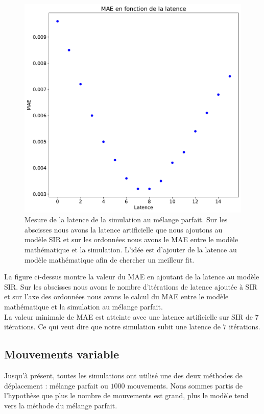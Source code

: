 \newpage

\begin{figure}[h]
	\centering
	\captionsetup{justification=centering}
	\includegraphics[width=.7\textwidth]{Images/SIR_latence_8_5.pdf}
	\caption[Mesures de latences SIR]{Mesure de la latence de la simulation au mélange parfait. Sur les abscisses nous avons la latence artificielle que nous ajoutons au modèle SIR et sur les ordonnées nous avons le MAE entre le modèle mathématique et la simulation. L'idée est d'ajouter de la latence au modèle mathématique afin de chercher un meilleur fit.}
\end{figure}

La figure ci-dessus montre la valeur du MAE en ajoutant de la latence au modèle SIR. Sur les abscisses nous avons le nombre d'itérations de latence ajoutée à SIR et sur l'axe des ordonnées nous avons le calcul du MAE entre le modèle mathématique et la simulation au mélange parfait.\\

La valeur minimale de MAE est atteinte avec une latence artificielle sur SIR de $7$ itérations. Ce qui veut dire que notre simulation subit une latence de $7$ itérations.

\newpage

\subsection{Mouvements variable}

Jusqu'à présent, toutes les simulations ont utilisé une des deux méthodes de déplacement : mélange parfait ou $1000$ mouvements. Nous sommes partis de l'hypothèse que plus le nombre de mouvements est grand, plus le modèle tend vers la méthode du mélange parfait.\\

